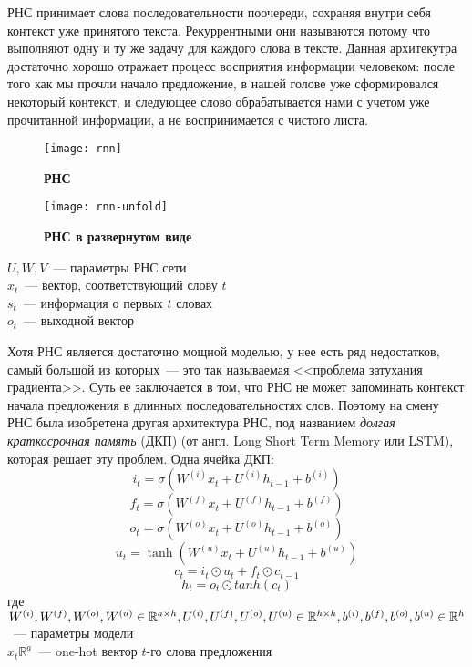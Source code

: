 РНС принимает слова последовательности поочереди, сохраняя внутри себя контекст уже принятого текста. Рекуррентными они называются потому что выполняют одну и ту же задачу для каждого слова в тексте. Данная архитекутра достаточно хорошо отражает процесс восприятия информации человеком: после того как мы прочли начало предложение, в нашей голове уже сформировался некоторый контекст, и следующее слово обрабатывается нами с учетом уже прочитанной информации, а не воспринимается с чистого листа.

\begin{figure}[h]
\texttt{[image: rnn]}
\caption{\textbf{РНС}}
\label{fig:rnn}
\end{figure}

\begin{figure}[h]
\texttt{[image: rnn-unfold]}
\caption{\textbf{РНС в развернутом виде}}
\label{fig:rnn-unfold}
\end{figure}

\noindent $U, W, V$~--- параметры РНС сети\\
$x_t$~--- вектор, соответствующий слову $t$ \\
$s_t$~--- информация о первых $t$ словах \\
$o_t$~--- выходной вектор

Хотя РНС является достаточно мощной моделью, у нее есть ряд недостатков, самый большой из которых~--- это так называемая <<проблема затухания градиента>>. Суть ее заключается в том, что РНС не может запоминать контекст начала предложения в длинных последовательностях слов. Поэтому на смену РНС была изобретена другая архитектура РНС, под названием \emph{долгая краткосрочная память} (ДКП) (от англ. Long Short Term Memory или LSTM), которая решает эту проблем\cite{Hochreiter:1997:LSM:265493.264179}. Одна ячейка ДКП:
$$i_t=\sigma \left( W^{(i)}x_t+U^{(i)}h_{t-1} + b^{(i)} \right)$$
$$f_t=\sigma \left( W^{(f)}x_t+U^{(f)}h_{t-1} + b^{(f)} \right)$$
$$o_t=\sigma \left( W^{(o)}x_t+U^{(o)}h_{t-1} + b^{(o)} \right)$$
$$u_t=\tanh \left( W^{(u)}x_t+U^{(u)}h_{t-1} + b^{(u)} \right)$$
$$c_t=i_t \odot u_t + f_t \odot c_{t-1}$$
$$h_t=o_t \odot tanh(c_t)$$
где $W^{(i)}, W^{(f)}, W^{(o)}, W^{(u)} \in \mathbb{R}^{a \times h},\\U^{(i)}, U^{(f)}, U^{(o)}, U^{(u)} \in \mathbb{R}^{h \times h},\\b^{(i)}, b^{(f)}, b^{(o)}, b^{(u)} \in \mathbb{R}^{h}$~--- параметры модели\\
$x_t \mathbb{R}^a$~--- one-hot вектор $t$-го слова предложения

